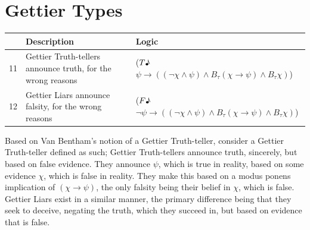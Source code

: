 \documentclass[12pt, titlepage, twoside, a4paper]{report}
\newcommand{\true}{$T\text{\textmusicalnote}$}
\newcommand{\false}{$F\text{\textmusicalnote}$}
\begin{document}
\chapter{Gettier Types}
\begin{table}[h]
\begin{tabular}{lp{6cm}p{8cm}}
\hline
   & Description                                                 & Logic                                                                                                           \\ \hline
11 & Gettier Truth-tellers announce truth, for the wrong reasons & (\true$\psi \to ((\neg \chi \wedge \psi ) \wedge B_\tau (\chi \to \psi ) \wedge B_\tau \chi)$)       \\
12 & Gettier Liars announce falsity, for the wrong reasons       & (\false$\neg \psi \to ((\neg \chi \wedge \psi ) \wedge B_\tau (\chi \to \psi ) \wedge B_\tau \chi)$) \\ \hline
\end{tabular}
\end{table}
Based on Van Bentham's notion of a Gettier Truth-teller\autocite{BenthemJohanvan2010Mlfo}, consider a Gettier Truth-teller defined as such; Gettier Truth-tellers announce truth, sincerely, but based on false evidence. They announce $\psi$, which is true in reality, based on some evidence $\chi$, which is false in reality. They make this based on a modus ponens implication of $(\chi \to \psi)$, the only falsity being their belief in $\chi$, which is false.\\
Gettier Liars exist in a similar manner, the primary difference being that they seek to deceive, negating the truth, which they succeed in, but based on evidence that is false.
\end{document}
